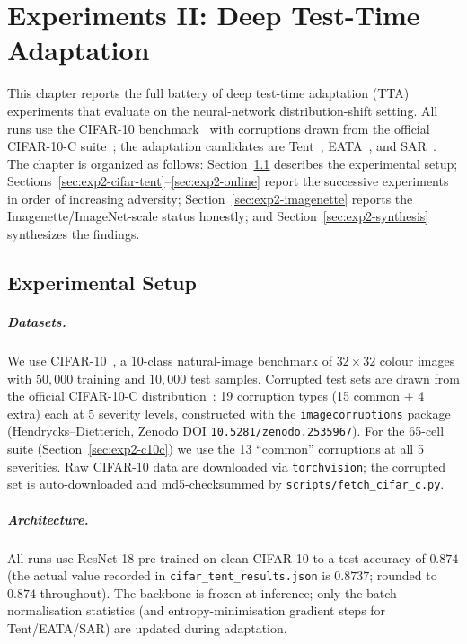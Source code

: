 \chapter{Experiments II: Deep Test-Time Adaptation}\label{ch:exp2}

This chapter reports the full battery of deep test-time adaptation (TTA)
experiments that evaluate \KGA{} on the neural-network distribution-shift
setting.  All runs use the CIFAR-10 benchmark~\cite{krizhevsky2009cifar} with
corruptions drawn from the official CIFAR-10-C
suite~\cite{hendrycks2019benchmarking}; the adaptation candidates are
Tent~\cite{wang2021tent}, EATA~\cite{niu2022eata}, and
SAR~\cite{niu2023sar}.  The chapter is organized as follows: Section~\ref{sec:exp2-setup}
describes the experimental setup; Sections~\ref{sec:exp2-cifar-tent}--\ref{sec:exp2-online}
report the successive experiments in order of increasing adversity;
Section~\ref{sec:exp2-imagenette} reports the Imagenette/ImageNet-scale status
honestly; and Section~\ref{sec:exp2-synthesis} synthesizes the findings.

\section{Experimental Setup}\label{sec:exp2-setup}

\paragraph{Datasets.}
We use CIFAR-10~\cite{krizhevsky2009cifar}, a 10-class natural-image
benchmark of $32{\times}32$ colour images with $50{,}000$ training and
$10{,}000$ test samples.  Corrupted test sets are drawn from the official
CIFAR-10-C distribution~\cite{hendrycks2019benchmarking}: 19 corruption
types (15 common + 4 extra) each at 5 severity levels, constructed with the
\texttt{imagecorruptions} package (Hendrycks--Dietterich, Zenodo DOI
\texttt{10.5281/zenodo.2535967}).  For the 65-cell suite
(Section~\ref{sec:exp2-c10c}) we use the 13 ``common'' corruptions at all
5 severities.  Raw CIFAR-10 data are downloaded via \texttt{torchvision};
the corrupted set is auto-downloaded and md5-checksummed by
\texttt{scripts/fetch\_cifar\_c.py}.

\paragraph{Architecture.}
All runs use ResNet-18 pre-trained on clean CIFAR-10 to a test accuracy of
$0.874$ (the actual value recorded in \texttt{cifar\_tent\_results.json} is
$0.8737$; rounded to $0.874$ throughout).  The backbone is frozen at
inference; only the batch-normalisation statistics (and entropy-minimisation
gradient steps for Tent/EATA/SAR) are updated during adaptation.

